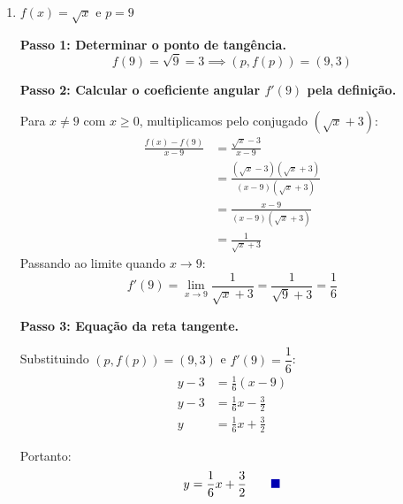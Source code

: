 \documentclass[12pt,a4paper]{article}
\newcommand{\qedsymbolmath}{\tag*{\textcolor{blue!70!black}{\rule{1.6ex}{1.6ex}}}}
\begin{document}
\begin{enumerate}
    \textbf{Passo 3: Equação da reta tangente.}

    Substituindo $(p, f(p)) = \left(2, \dfrac{1}{2}\right)$ e $f'(2) = -\dfrac{1}{4}$:
    \begin{align*}
        y - \frac{1}{2} &= -\frac{1}{4}(x - 2) \\[0.25cm]
        y - \frac{1}{2} &= -\frac{1}{4}x + \frac{1}{2} \\[0.25cm]
        y &= -\frac{1}{4}x + 1
    \end{align*}

    Portanto:
    \begin{equation*}
        y = -\frac{1}{4}x + 1 \qedsymbolmath
    \end{equation*}

    \item $f(x) = \sqrt{x}$ e $p = 9$
    
    \textbf{Passo 1: Determinar o ponto de tangência.}
    \[
    f(9) = \sqrt{9} = 3 \implies (p, f(p)) = (9, 3)
    \]

    \textbf{Passo 2: Calcular o coeficiente angular $f'(9)$ pela definição.}

    Para $x \neq 9$ com $x \ge 0$, multiplicamos pelo conjugado $(\sqrt{x} + 3)$:
    \begin{align*}
        \frac{f(x) - f(9)}{x - 9} &= \frac{\sqrt{x} - 3}{x - 9} \\[0.25cm]
        &= \frac{(\sqrt{x} - 3)(\sqrt{x} + 3)}{(x - 9)(\sqrt{x} + 3)} \\[0.25cm]
        &= \frac{x - 9}{(x - 9)(\sqrt{x} + 3)} \\[0.25cm]
        &= \frac{1}{\sqrt{x} + 3}
    \end{align*}
    Passando ao limite quando $x \to 9$:
    \[
    f'(9) = \lim_{x \to 9} \frac{1}{\sqrt{x} + 3} = \frac{1}{\sqrt{9} + 3} = \frac{1}{6}
    \]

    \textbf{Passo 3: Equação da reta tangente.}

    Substituindo $(p, f(p)) = (9, 3)$ e $f'(9) = \dfrac{1}{6}$:
    \begin{align*}
        y - 3 &= \frac{1}{6}(x - 9) \\[0.25cm]
        y - 3 &= \frac{1}{6}x - \frac{3}{2} \\[0.25cm]
        y &= \frac{1}{6}x + \frac{3}{2}
    \end{align*}

    Portanto:
    \begin{equation*}
        y = \frac{1}{6}x + \frac{3}{2} \qedsymbolmath
    \end{equation*}


\end{enumerate}
\end{document}
